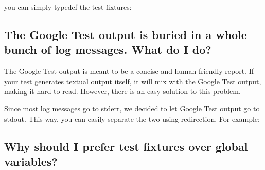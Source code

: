 \begin{DoxyCode}{0}
\DoxyCodeLine{}
\DoxyCodeLine{}
\DoxyCodeLine{}
\end{DoxyCode}


you can simply {\ttfamily typedef} the test fixtures\+: 
\begin{DoxyCode}{0}
\DoxyCodeLine{}
\DoxyCodeLine{}
\DoxyCodeLine{}
\end{DoxyCode}


\subsection*{The Google Test output is buried in a whole bunch of log messages. What do I do?}

The Google Test output is meant to be a concise and human-\/friendly report. If your test generates textual output itself, it will mix with the Google Test output, making it hard to read. However, there is an easy solution to this problem.

Since most log messages go to stderr, we decided to let Google Test output go to stdout. This way, you can easily separate the two using redirection. For example\+: 
\begin{DoxyCode}{0}
\end{DoxyCode}


\subsection*{Why should I prefer test fixtures over global variables?}

